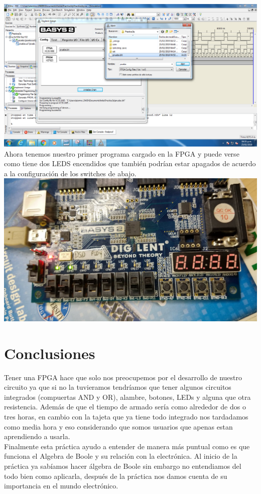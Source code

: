 \documentclass{mylib/reporteConCalif}
\begin{document}
\includegraphics[width=15cm]{img/labdise_practica3/image1}\\

Ahora tenemos nuestro primer programa cargado en la FPGA y puede verse como tiene dos LEDS encendidos que también podrían estar apagados de acuerdo a la configuración de los switches de abajo.\\

\includegraphics[width=15cm]{img/labdise_practica3/funciona}\\

\section{Conclusiones}

Tener una FPGA hace que solo nos preocupemos por el desarrollo de nuestro circuito ya que si no la tuvieramos tendríamos que tener algunos circuitos integrados (compuertas AND y OR), alambre, botones, LEDs y alguna que otra resistencia. Además de que el tiempo de armado sería como alrededor de dos o tres horas, en cambio con la tajeta que ya tiene todo integrado nos tardadamos como media hora y eso considerando que somos usuarios que apenas estan aprendiendo a usarla.\\

Finalmente esta práctica ayudo a entender de manera más puntual como es que funciona el Algebra de Boole y su relación con la electrónica. Al inicio de la práctica ya sabíamos hacer álgebra de Boole sin embargo no entendiamos del todo bien como aplicarla, después de la práctica nos damos cuenta de su importancia en el mundo electrónico.
\end{document}

